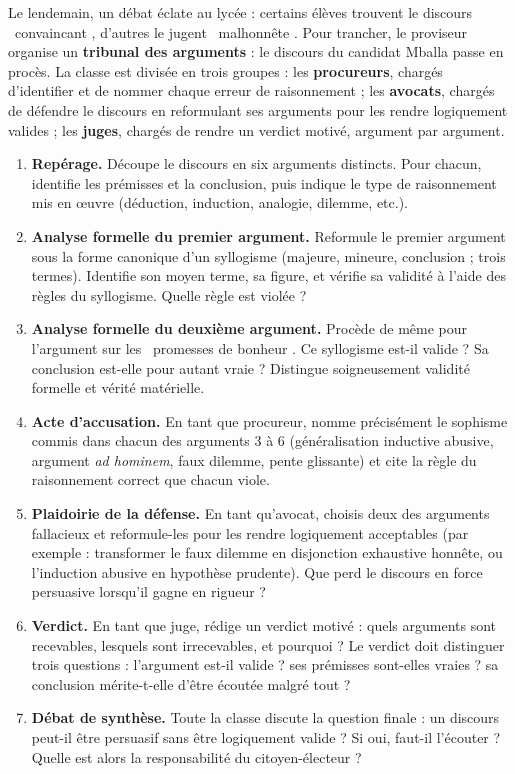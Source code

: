 \documentclass[11pt]{article}
\newcommand{\cle}[1]{{\popxbold\color{popdark}#1}}
\newcounter{popsec}
\newcounter{popsub}
\newcommand{\courssub}[1]{%
  \stepcounter{popsub}%
  \par\vspace{9pt}\noindent{\popxbold\fontsize{11.5}{13}\selectfont\color{popink}{\color{poporange}\thepopsec.\thepopsub}\hspace{6pt}#1}\par\nopagebreak\vspace{4pt}
}
\begin{document}
Le lendemain, un débat éclate au lycée : certains élèves trouvent le discours \guillemotleft\ convaincant \guillemotright, d'autres le jugent \guillemotleft\ malhonnête \guillemotright. Pour trancher, le proviseur organise un \textbf{tribunal des arguments} : le discours du candidat Mballa passe en procès. La classe est divisée en trois groupes : les \textbf{procureurs}, chargés d'identifier et de nommer chaque erreur de raisonnement ; les \textbf{avocats}, chargés de défendre le discours en reformulant ses arguments pour les rendre logiquement valides ; les \textbf{juges}, chargés de rendre un verdict motivé, argument par argument.

\courssub{Consignes}

\begin{enumerate}
\item \textbf{Repérage.} Découpe le discours en six arguments distincts. Pour chacun, identifie les prémisses et la conclusion, puis indique le type de raisonnement mis en œuvre (déduction, induction, analogie, dilemme, etc.).
\item \textbf{Analyse formelle du premier argument.} Reformule le premier argument sous la forme canonique d'un syllogisme (majeure, mineure, conclusion ; trois termes). Identifie son moyen terme, sa figure, et vérifie sa validité à l'aide des règles du syllogisme. Quelle règle est violée ?
\item \textbf{Analyse formelle du deuxième argument.} Procède de même pour l'argument sur les \guillemotleft\ promesses de bonheur \guillemotright. Ce syllogisme est-il valide ? Sa conclusion est-elle pour autant vraie ? Distingue soigneusement validité formelle et vérité matérielle.
\item \textbf{Acte d'accusation.} En tant que procureur, nomme précisément le sophisme commis dans chacun des arguments 3 à 6 (généralisation inductive abusive, argument \emph{ad hominem}, faux dilemme, pente glissante) et cite la règle du raisonnement correct que chacun viole.
\item \textbf{Plaidoirie de la défense.} En tant qu'avocat, choisis deux des arguments fallacieux et reformule-les pour les rendre logiquement acceptables (par exemple : transformer le faux dilemme en disjonction exhaustive honnête, ou l'induction abusive en hypothèse prudente). Que perd le discours en force persuasive lorsqu'il gagne en rigueur ?
\item \textbf{Verdict.} En tant que juge, rédige un verdict motivé : quels arguments sont recevables, lesquels sont irrecevables, et pourquoi ? Le verdict doit distinguer trois questions : l'argument est-il valide ? ses prémisses sont-elles vraies ? sa conclusion mérite-t-elle d'être écoutée malgré tout ?
\item \textbf{Débat de synthèse.} Toute la classe discute la question finale : un discours peut-il être \cle{persuasif} sans être logiquement \cle{valide} ? Si oui, faut-il l'écouter ? Quelle est alors la responsabilité du citoyen-électeur ?
\end{enumerate}
\end{document}
